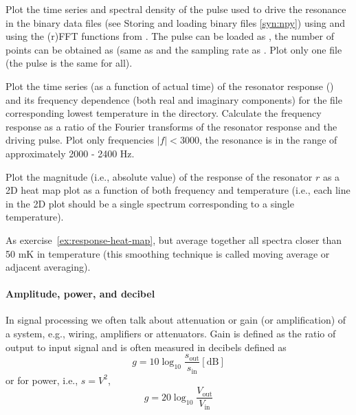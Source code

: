 \begin{exercise}
    Plot the time series and spectral density of the pulse used to drive the resonance in the  binary data files (see Storing and loading binary files \ref{syn:npy}) using  and using the (r)FFT functions from . The pulse can be loaded as , the number of points can be obtained as  (same as  and the sampling rate as . Plot only one file (the pulse is the same for all).
\end{exercise}

\begin{exercise}
    Plot the time series (as a function of actual time) of the resonator response () and its frequency dependence (both real and imaginary components) for the file corresponding lowest temperature in the  directory. Calculate the frequency response as a ratio of the Fourier transforms of the resonator response and the driving pulse. Plot only frequencies $|f| < 3000$, the resonance is in the range of approximately 2000 - 2400 Hz.
\end{exercise}

\begin{exercise}
    \label{ex:response-heat-map}
    Plot the magnitude (i.e., absolute value) of the response of the resonator $r$ as a 2D heat map plot as a function of both frequency and temperature (i.e., each line in the 2D plot should be a single spectrum corresponding to a single temperature).
\end{exercise}

\begin{exercise}
    As exercise~\ref{ex:response-heat-map}, but average together all spectra closer than 50 mK in temperature (this smoothing technique is called moving average or adjacent averaging).
\end{exercise}

\paragraph{Amplitude, power, and decibel}

In signal processing we often talk about attenuation or gain (or amplification) of a system, e.g., wiring, amplifiers or attenuators. Gain is defined as the ratio of output to input signal and is often measured in decibels defined as
\begin{equation}
    g = 10\log_{10}\frac{s_\mathrm{out}}{s_\mathrm{in}} \mathrm{[dB]}
\end{equation}
or for power, i.e., $s = V^2$,
\begin{equation}
    g = 20\log_{10}\frac{V_\mathrm{out}}{V_\mathrm{in}}
\end{equation}


